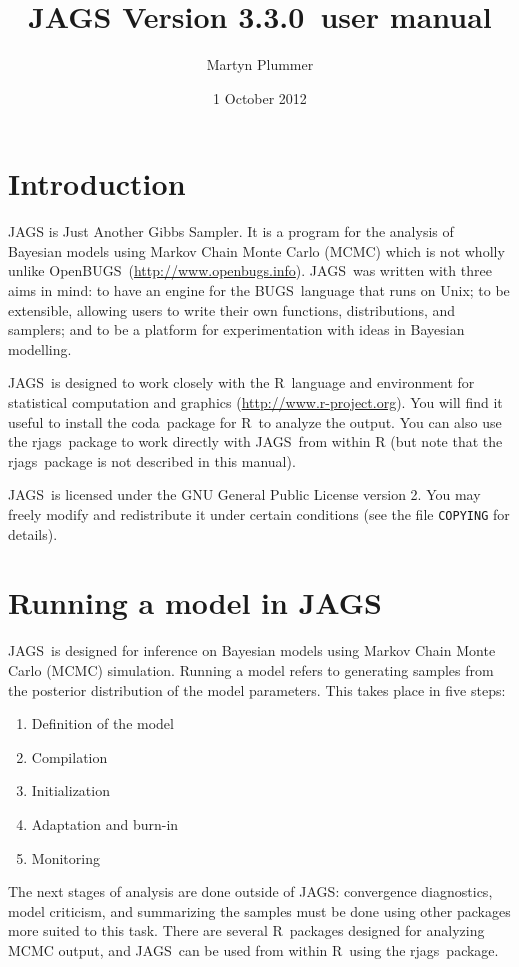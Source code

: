 \documentclass[11pt, a4paper, titlepage]{report}
\newcommand{\release}{3.3.0}
\newcommand{\JAGS}{\textsf{JAGS}}
\newcommand{\rjags}{\textsf{rjags}}
\newcommand{\BUGS}{\textsf{BUGS}}
\newcommand{\OpenBUGS}{\textsf{OpenBUGS}}
\newcommand{\R}{\textsf{R}}
\newcommand{\CODA}{\textsf{coda}}
\begin{document}
\title{JAGS Version \release\ user manual}
\author{Martyn Plummer}
\date{1 October 2012}
\maketitle

\tableofcontents

\chapter{Introduction}

JAGS is Just Another Gibbs Sampler.  It is a program for the analysis
of Bayesian models using Markov Chain Monte Carlo (MCMC) which is not
wholly unlike
\OpenBUGS\ (\url{http://www.openbugs.info}). \JAGS\ was written
with three aims in mind: to have an engine for the \BUGS\ language
that runs on Unix; to be extensible, allowing users to write their own
functions, distributions, and samplers; and to be a platform for
experimentation with ideas in Bayesian modelling.

\JAGS\ is designed to work closely with the \R\ language and
environment for statistical computation and graphics
(\url{http://www.r-project.org}).  You will find it useful to install
the \CODA\ package for \R\ to analyze the output. You can also use the
\rjags\ package to work directly with \JAGS\ from within R (but note
that the \rjags\ package is not described in this manual).

\JAGS\ is licensed under the GNU General Public License
version 2. You may freely modify and redistribute it under certain
conditions (see the file \texttt{COPYING} for details).

\chapter{Running a model in \JAGS}

\JAGS\ is designed for inference on Bayesian models using Markov Chain
Monte Carlo (MCMC) simulation.  Running a model refers to generating
samples from the posterior distribution of the model parameters.  This
takes place in five steps:
\begin{enumerate}
\item Definition of the model
\item Compilation
\item Initialization
\item Adaptation and burn-in
\item Monitoring
\end{enumerate}
The next stages of analysis are done outside of \JAGS: convergence
diagnostics, model criticism, and summarizing the samples must be done
using other packages more suited to this task. There are several
\R\ packages designed for analyzing MCMC output, and \JAGS\ can be
used from within \R\ using the \rjags\ package.
\end{document}
